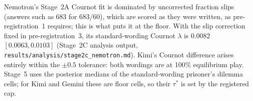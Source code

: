 \documentclass[10pt]{article}
\theoremstyle{definition}
\theoremstyle{remark}
\newcommand{\lam}{\lambda}
\begin{document}
\noindent Nemotron's Stage~2A Cournot fit is dominated by uncorrected fraction slips (answers
such as 683 for $683/60$), which are scored as they were written, as pre-registration~1
requires; this is what puts it at the floor. With the slip correction fixed in
pre-registration~3, its standard-wording Cournot $\lam$ is 0.0082 $[0.0063,0.0103]$ (Stage~2C
analysis output, \texttt{results/analysis/stage2c\_nemotron.md}). Kimi's Cournot difference
arises entirely within the $\pm0.5$ tolerance: both wordings are at 100\% equilibrium play. Stage~5
uses the posterior medians of the standard-wording prisoner's dilemma cells; for Kimi and Gemini
these are floor cells, so their $\tau^*$ is set by the registered cap.
\end{document}
